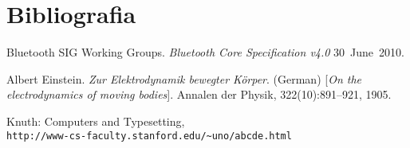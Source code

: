 
\section{Bibliografia}

\begin{thebibliography}{9}
Bluetooth SIG Working Groups. 
\textit{Bluetooth\textsuperscript{\textregistered} Core Specification v4.0}
\mbox{30 June 2010}.
 
Albert Einstein. 
\textit{Zur Elektrodynamik bewegter K{\"o}rper}. (German) 
[\textit{On the electrodynamics of moving bodies}]. 
Annalen der Physik, 322(10):891–921, 1905.
 
Knuth: Computers and Typesetting,
\\\texttt{http://www-cs-faculty.stanford.edu/\~{}uno/abcde.html}
\end{thebibliography}